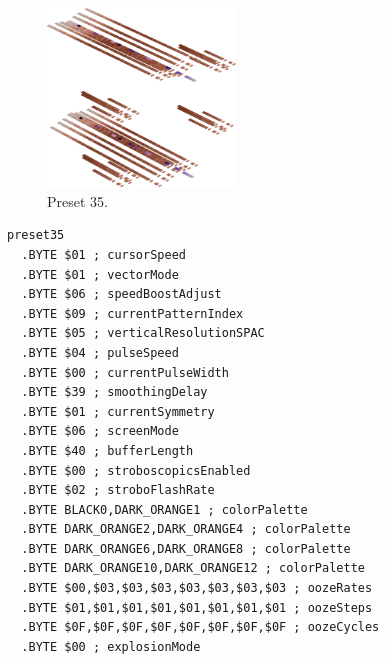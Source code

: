 \vspace*{0.5cm}
\begin{minipage}[b]{0.48\linewidth}
\begin{figure}[H]                                                          
  \centering                                                             
  \begin{adjustbox}{width=5cm,center}                                   
  \includegraphics[width=5cm]{src/colorspace_presets/preset35-45.png}%
  \end{adjustbox}                                                        
\caption*{Preset 35.}                                           
\end{figure}                                                               
\end{minipage}
\hspace{0.1cm}
\begin{minipage}[b]{0.48\linewidth}                                                                         
\begin{lstlisting}[basicstyle=\ttfamily\tiny]
preset35
  .BYTE $01 ; cursorSpeed
  .BYTE $01 ; vectorMode
  .BYTE $06 ; speedBoostAdjust
  .BYTE $09 ; currentPatternIndex
  .BYTE $05 ; verticalResolutionSPAC
  .BYTE $04 ; pulseSpeed
  .BYTE $00 ; currentPulseWidth
  .BYTE $39 ; smoothingDelay
  .BYTE $01 ; currentSymmetry
  .BYTE $06 ; screenMode
  .BYTE $40 ; bufferLength
  .BYTE $00 ; stroboscopicsEnabled
  .BYTE $02 ; stroboFlashRate
  .BYTE BLACK0,DARK_ORANGE1 ; colorPalette
  .BYTE DARK_ORANGE2,DARK_ORANGE4 ; colorPalette
  .BYTE DARK_ORANGE6,DARK_ORANGE8 ; colorPalette
  .BYTE DARK_ORANGE10,DARK_ORANGE12 ; colorPalette
  .BYTE $00,$03,$03,$03,$03,$03,$03,$03 ; oozeRates
  .BYTE $01,$01,$01,$01,$01,$01,$01,$01 ; oozeSteps
  .BYTE $0F,$0F,$0F,$0F,$0F,$0F,$0F,$0F ; oozeCycles
  .BYTE $00 ; explosionMode
\end{lstlisting}
\end{minipage}


